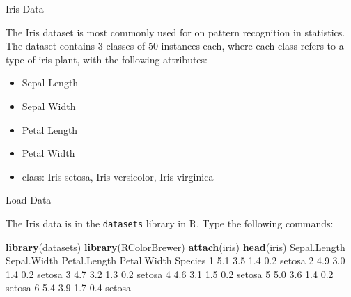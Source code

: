 \documentclass[ignorenonframetext,]{beamer}
\newenvironment{Shaded}{\begin{snugshade}}{\end{snugshade}}
\newcommand{\KeywordTok}[1]{\textcolor[rgb]{0.13,0.29,0.53}{\textbf{{#1}}}}
\newcommand{\DecValTok}[1]{\textcolor[rgb]{0.00,0.00,0.81}{{#1}}}
\newcommand{\FloatTok}[1]{\textcolor[rgb]{0.00,0.00,0.81}{{#1}}}
\newcommand{\NormalTok}[1]{{#1}}
\providecommand{\tightlist}{%
\setlength{\itemsep}{0pt}\setlength{\parskip}{0pt}}
\begin{document}
\begin{frame}{Iris Data}

The Iris dataset is most commonly used for on pattern recognition in
statistics. The dataset contains 3 classes of 50 instances each, where
each class refers to a type of iris plant, with the following
attributes:

\begin{itemize}
\tightlist
\item
  Sepal Length
\item
  Sepal Width
\item
  Petal Length\\
\item
  Petal Width
\item
  class: Iris setosa, Iris versicolor, Iris virginica
\end{itemize}

\end{frame}

\begin{frame}[fragile]{Load Data}

The Iris data is in the \texttt{datasets} library in R. Type the
following commands:

\small

\begin{Shaded}
\begin{Highlighting}[]
\KeywordTok{library}\NormalTok{(datasets)}
\KeywordTok{library}\NormalTok{(RColorBrewer)}
\KeywordTok{attach}\NormalTok{(iris)}
\KeywordTok{head}\NormalTok{(iris)}
  \NormalTok{Sepal.Length Sepal.Width Petal.Length Petal.Width Species}
\DecValTok{1}          \FloatTok{5.1}         \FloatTok{3.5}          \FloatTok{1.4}         \FloatTok{0.2}  \NormalTok{setosa}
\DecValTok{2}          \FloatTok{4.9}         \FloatTok{3.0}          \FloatTok{1.4}         \FloatTok{0.2}  \NormalTok{setosa}
\DecValTok{3}          \FloatTok{4.7}         \FloatTok{3.2}          \FloatTok{1.3}         \FloatTok{0.2}  \NormalTok{setosa}
\DecValTok{4}          \FloatTok{4.6}         \FloatTok{3.1}          \FloatTok{1.5}         \FloatTok{0.2}  \NormalTok{setosa}
\DecValTok{5}          \FloatTok{5.0}         \FloatTok{3.6}          \FloatTok{1.4}         \FloatTok{0.2}  \NormalTok{setosa}
\DecValTok{6}          \FloatTok{5.4}         \FloatTok{3.9}          \FloatTok{1.7}         \FloatTok{0.4}  \NormalTok{setosa}
\end{Highlighting}
\end{Shaded}

\end{frame}
\end{document}
